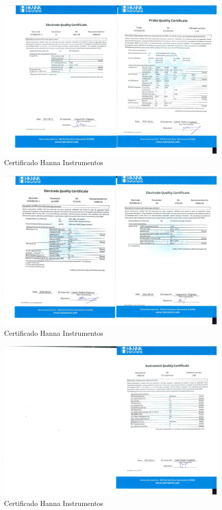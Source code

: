 \begin{figure}
    \centering
    \includegraphics[width=1\linewidth]{Anexos/1.pdf}
    \caption{Certificado Hanna Instrumentos}
    \label{fig:enter-label}
\end{figure}

\begin{figure}
    \centering
    \includegraphics[width=1\linewidth]{Anexos/2.pdf}
    \caption{Certificado Hanna Instrumentos}
    \label{fig:enter-label}
\end{figure}

\begin{figure}
    \centering
    \includegraphics[width=1\linewidth]{Anexos/3.pdf}
    \caption{Certificado Hanna Instrumentos}
    \label{fig:enter-label}
\end{figure}